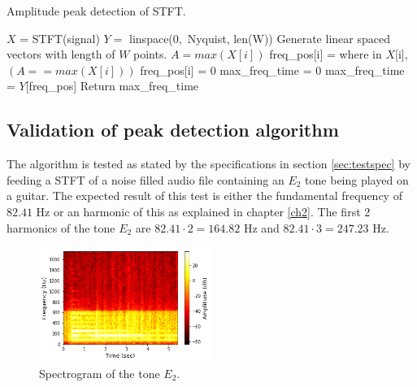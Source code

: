 \begin{algorithm}[H]
\caption{Amplitude peak detection of STFT.}
\label{alg:FIR}
\begin{algorithmic}[1]
\State  $X$ = STFT(signal) 
\State $Y =$ linspace($0,$ Nyquist, len(W)) \Comment Generate linear spaced vectors with length of $W$ points.
		\State $A = max(X[i])$ 
		 
			\State freq\_pos[i] = where in $X$[i], $(A == max(X[i]))$ 
		\Else
			\State freq\_pos[i] = 0	
		\EndIf
			\State max\_freq\_time = 0
		\Else
			\State max\_freq\_time = $Y$[freq\_pos]
		\EndIf
	\EndFor
	\State Return max\_freq\_time
\EndProcedure
\end{algorithmic}
\end{algorithm}

\subsection{Validation of peak detection algorithm}
The algorithm is tested as stated by the specifications in section \ref{sec:testspec} by feeding a STFT of a noise filled audio file containing an $E_2$ tone being played on a guitar. 
The expected result of this test is either the fundamental frequency of $82.41$ Hz or an harmonic of this as explained in chapter \ref{ch2}. The first 2 harmonics of the tone $E_2$ are $82.41 \cdot 2 = 164.82$ Hz and $82.41 \cdot 3 = 247.23$ Hz.

\begin{figure}[H]
\centering 
\includegraphics[width=0.5\textwidth]{figures/peak_detection/20170511_spectogram_E_2.png}
\caption{Spectrogram of the tone $E_2$.}
\label{fig:spec_E_2}
\end{figure}

